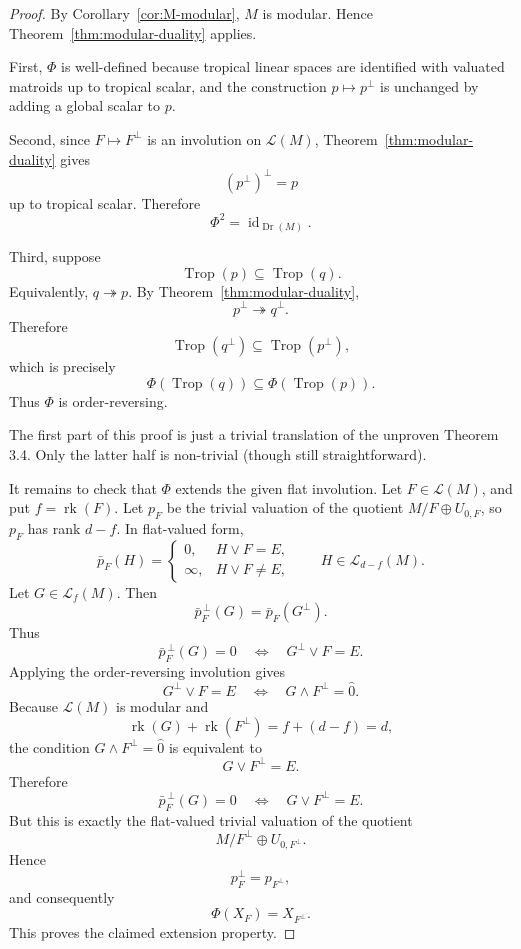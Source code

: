 \documentclass[12pt]{article}
\newcommand{\Trop}{\operatorname{Trop}}
\newcommand{\Dr}{\operatorname{Dr}}
\newcommand{\rk}{\operatorname{rk}}
\newcommand{\cL}{\mathcal L}
\theoremstyle{plain}
\theoremstyle{definition}
\newcommand{\review}[1]{\begin{reviewbox}#1\end{reviewbox}}
\begin{document}
\begin{proof}
By Corollary~\ref{cor:M-modular}, \(M\) is modular.  Hence Theorem~\ref{thm:modular-duality} applies.

First, \(\Phi\) is well-defined because tropical linear spaces are identified with valuated matroids up to tropical scalar, and the construction \(p\mapsto p^\perp\) is unchanged by adding a global scalar to \(p\).

Second, since \(F\mapsto F^\perp\) is an involution on \(\cL(M)\), Theorem~\ref{thm:modular-duality} gives
\[
   (p^\perp)^\perp=p
\]
up to tropical scalar.  Therefore
\[
   \Phi^2=\operatorname{id}_{\Dr(M)}.
\]

Third, suppose
\[
   \Trop(p)\subseteq \Trop(q).
\]
Equivalently, \(q\twoheadrightarrow p\).  By Theorem~\ref{thm:modular-duality},
\[
   p^\perp\twoheadrightarrow q^\perp.
\]
Therefore
\[
   \Trop(q^\perp)\subseteq \Trop(p^\perp),
\]
which is precisely
\[
   \Phi(\Trop(q))\subseteq \Phi(\Trop(p)).
\]
Thus \(\Phi\) is order-reversing.

\review{The first part of this proof is just a trivial translation of the unproven Theorem 3.4. Only the latter half is non-trivial (though still straightforward).}

It remains to check that \(\Phi\) extends the given flat involution.  Let \(F\in\cL(M)\), and put \(f=\rk(F)\).  Let \(p_F\) be the trivial valuation of the quotient \(M/F\oplus U_{0,F}\), so \(p_F\) has rank \(d-f\).  In flat-valued form,
\[
   \bar p_F(H)=
   \begin{cases}
   0, & H\vee F=E,\\
   \infty, & H\vee F\ne E,
   \end{cases}
   \qquad H\in \cL_{d-f}(M).
\]
Let \(G\in\cL_f(M)\).  Then
\[
   \bar p_F^{\,\perp}(G)
   =
   \bar p_F(G^\perp).
\]
Thus
\[
   \bar p_F^{\,\perp}(G)=0
   \quad\Longleftrightarrow\quad
   G^\perp\vee F=E.
\]
Applying the order-reversing involution gives
\[
   G^\perp\vee F=E
   \quad\Longleftrightarrow\quad
   G\wedge F^\perp=\hat 0.
\]
Because \(\cL(M)\) is modular and
\[
   \rk(G)+\rk(F^\perp)=f+(d-f)=d,
\]
the condition \(G\wedge F^\perp=\hat 0\) is equivalent to
\[
   G\vee F^\perp=E.
\]
Therefore
\[
   \bar p_F^{\,\perp}(G)=0
   \quad\Longleftrightarrow\quad
   G\vee F^\perp=E.
\]
But this is exactly the flat-valued trivial valuation of the quotient
\[
   M/F^\perp\oplus U_{0,F^\perp}.
\]
Hence
\[
   p_F^\perp=p_{F^\perp},
\]
and consequently
\[
   \Phi(X_F)=X_{F^\perp}.
\]
This proves the claimed extension property.
\end{proof}
\end{document}
